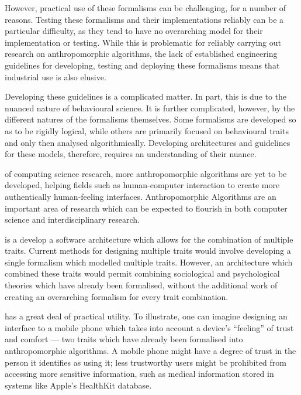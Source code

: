 However, practical use of these formalisms can be challenging, for a number of reasons. Testing these formalisms and their implementations reliably can be a particular difficulty, as they tend to have no overarching model for their implementation or testing\cite{Chandrasekaran2011}. While this is problematic for reliably carrying out research on anthropomorphic algorithms, the lack of established engineering guidelines for developing, testing and deploying these formalisms means that industrial use is also elusive.\par

Developing these guidelines is a complicated matter. In part, this is due to the nuanced nature of behavioural science. It is further complicated, however, by the different natures of the formalisms themselves. Some formalisms are developed so as to be rigidly logical\cite{Castelfranchi}, while others are primarily focused on behavioural traits and only then analysed algorithmically\cite{marsh1994}. Developing architectures and guidelines for these models, therefore, requires an understanding of their nuance.\par

 of computing science research, more anthropomorphic algorithms are yet to be developed, helping fields such as human-computer interaction to create more authentically human-feeling interfaces. Anthropomorphic Algorithms are an important area of research which can be expected to flourish in both computer science and interdisciplinary research.

\bigskip %

 is a develop a software architecture which allows for the combination of multiple traits. Current methods for designing multiple traits would involve developing a single formalism which modelled multiple traits. However, an architecture which combined these traits would permit combining sociological and psychological theories which have already been formalised, without the additional work of creating an overarching formalism for every trait combination.

 has a great deal of practical utility. To illustrate, one can imagine designing an interface to a mobile phone which takes into account a device's ``feeling'' of trust and comfort --- two traits which have already been formalised into anthropomorphic algorithms.\cite{Marsh2011, marsh1994} A mobile phone might have a degree of trust in the person it identifies as using it; less trustworthy users might be prohibited from accessing more sensitive information, such as medical information stored in systems like Apple's HealthKit database.\par

